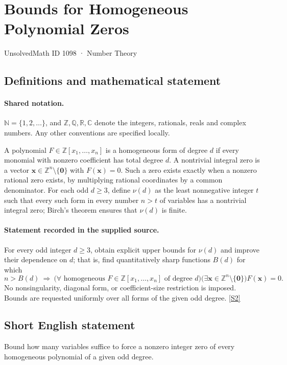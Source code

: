 \documentclass[11pt]{article}
\newcommand{\sref}[2]{\hyperlink{source:#1:#2}{[S#2]}}
\begin{document}
\setcounter{section}{1097}
\section{Bounds for Homogeneous Polynomial Zeros}\label{1098}
{\small\sffamily UnsolvedMath ID 1098 · Number Theory}
\subsection{Definitions and mathematical statement}

\paragraph{Shared notation.}$\mathbb N=\{1,2,\ldots\}$, and $\mathbb Z,\mathbb Q,\mathbb R,\mathbb C$ denote the integers, rationals, reals and complex numbers. Any other conventions are specified locally.


A polynomial $F\in\mathbb Z[x_1,\ldots,x_n]$ is a homogeneous form of degree $d$ if every monomial with nonzero coefficient has total degree $d$. A nontrivial integral zero is a vector $\mathbf x\in\mathbb Z^n\setminus\{\mathbf0\}$ with $F(\mathbf x)=0$. Such a zero exists exactly when a nonzero rational zero exists, by multiplying rational coordinates by a common denominator. For each odd $d\geq3$, define $\nu(d)$ as the least nonnegative integer $t$ such that every such form in every number $n>t$ of variables has a nontrivial integral zero; Birch's theorem ensures that $\nu(d)$ is finite.
\paragraph{Statement recorded in the supplied source.}
For every odd integer $d\geq3$, obtain explicit upper bounds for $\nu(d)$ and improve their dependence on $d$; that is, find quantitatively sharp functions $B(d)$ for which
\[
 n>B(d)\ \Longrightarrow\
 \bigl(\forall\text{ homogeneous }F\in\mathbb Z[x_1,\ldots,x_n]
 \text{ of degree }d\bigr)
 \bigl(\exists\mathbf x\in\mathbb Z^n\setminus\{\mathbf0\}\bigr)
 F(\mathbf x)=0.
\]
No nonsingularity, diagonal form, or coefficient-size restriction is imposed. Bounds are requested uniformly over all forms of the given odd degree. \sref{1098}{2}
\subsection{Short English statement}
Bound how many variables suffice to force a nonzero integer zero of every homogeneous polynomial of a given odd degree.
\end{document}
